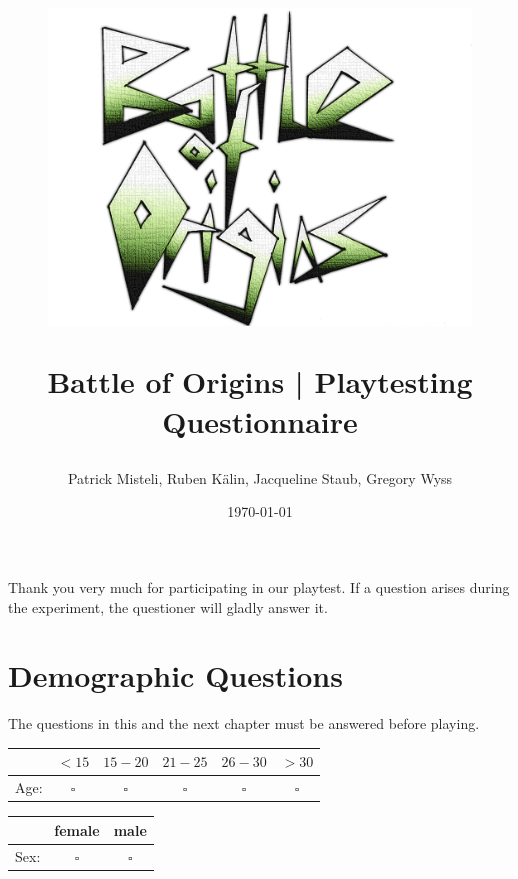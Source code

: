 \documentclass[11pt,a4paper,titlepage,table]{article}
\title{\blue  
	\begin{figure}[h!]
  		\centering
    	\includegraphics[width=1\textwidth]{img/logo3}
	\end{figure}
	\blueb Battle of Origins | Playtesting Questionnaire}
\author{Patrick Misteli, Ruben Kälin, Jacqueline Staub, Gregory Wyss}
\date{\today}
\begin{document}
	\hypersetup{linkcolor=MyColor1}	
	
\maketitle

Thank you very much for participating in our playtest. If a question arises during the experiment, the questioner will gladly answer it.

\section{Demographic Questions}

The questions in this and the next chapter must be answered before playing.

\begin{table}[H]
\begin{tabular}{|l|c|c|c|c|c|}
	\hline
  		& 
  			$<15$ & $15-20$ & $21-25$ & $26-30$ & $>30$\\
  	\hline
  		Age: & 
  			$\square$ & $\square$ & $\square$ & $\square$ & $\square$\\
  	\hline
\end{tabular}
\end{table}

\begin{table}[H]
\begin{tabular}{|l|c|c|}
	\hline
  		& 
  			female & male\\
  	\hline
  		Sex: & 
  			$\square$ & $\square$\\
  	\hline
\end{tabular}
\end{table}
\end{document}
